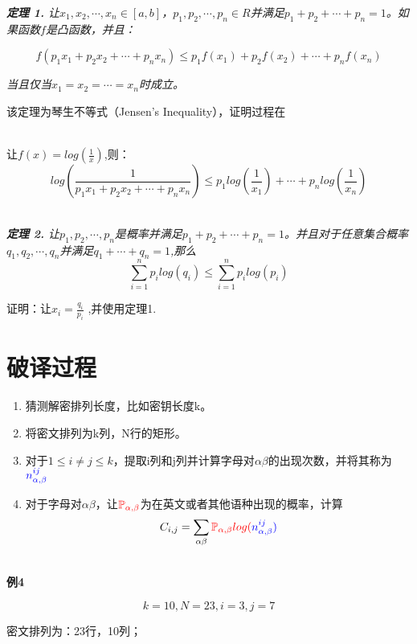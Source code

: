 \documentclass{article}
\begin{document}
\textit{\textbf{定理 1.} 让$x_1,x_2, \cdots,x_n \in [a,b]$，$p_1,p_2, \cdots ,p_n \in R$并满足$p_1+p_2+\cdots+p_n=1$。如果函数$f$是凸函数，并且：}


$$f(p_1x_1+p_2x_2+\cdots+p_nx_n) \leq p_1f(x_1)+p_2f(x_2)+\cdots+p_nf(x_n)$$

\textit{当且仅当$x_1=x_2=\cdots=x_n$时成立。}

该定理为琴生不等式（Jensen's Inequality），证明过程在\href{https://www.math.cuhk.edu.hk/course_builder/1819/math3060/Elementary\%20Inequalities.pdf}{\color{blue}{这里}} 

~\\

让$f(x) = log(\frac{1}{x})$,则：
$$log(\frac{1}{p_1x_1+p_2x_2+ \cdots +p_nx_n})\leq p_1log(\frac{1}{x_1})+ \cdots + p_nlog(\frac{1}{x_n})$$

~\\

\textit{\textbf{定理 2.} 让$p_1,p_2, \cdots ,p_n$是概率并满足$p_1+p_2+\cdots+p_n=1$。并且对于任意集合概率$q_1,q_2,\cdots,q_n$并满足$q_1+\cdots+q_n=1$,那么}
$$\sum_{i=1}^{n}p_ilog(q_i) \leq \sum_{i=1}^{n}p_i log(p_i)$$

证明：让$x_i = \frac{q_i}{p_i}$ ,并使用定理1.


\section{破译过程}
\begin{enumerate}
\item 猜测解密排列长度，比如密钥长度k。
\item 将密文排列为k列，N行的矩形。
\item 对于$1\leq i \ne j \leq k$，提取i列和j列并计算字母对$\alpha \beta$的出现次数，并将其称为$\color{blue}{n^{ij}_{\alpha, \beta}}$
\item 对于字母对$\alpha \beta$，让$\color{red}{\mathbb{P}_{\alpha, \beta}}$为在英文或者其他语种出现的概率，计算
$$C_{i,j} = \sum_{\alpha \beta} \color{red}{\mathbb{P}_{\alpha, \beta}}log(\color{blue}{n^{ij}_{\alpha, \beta})}$$
\end{enumerate}

~\\

\textbf{例4}

$$k = 10,N =23,i =3,j=7$$

密文排列为：23行，10列；
\end{document}
